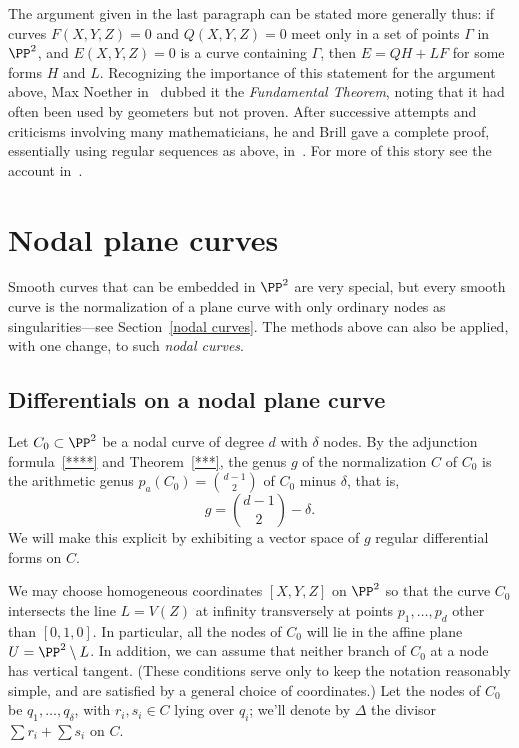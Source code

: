 The argument given in the last paragraph can be stated more generally thus:  if curves $F(X,Y,Z)=0$ and $Q(X,Y,Z)=0$ 
meet only in a set of  points $\Gamma$ in $\PP^{2}$, and $E(X,Y,Z) = 0$ is a curve containing
$\Gamma$, then $E = QH +LF$ for some forms $H$ and $L$. Recognizing the importance of this
statement for the argument above, Max Noether in~\cite{} dubbed it the \emph{Fundamental Theorem}, 
noting that it had often been used by geometers but not proven. After successive attempts and 
criticisms involving many mathematicians, he and Brill gave a complete proof, essentially using
regular sequences as above, in~\cite{}. For more of this story see the account in~\cite{Eisenbud-Gray}.

\section{Nodal plane curves}


Smooth curves that can be embedded in $\PP^{2}$ are very special, but every smooth curve 
is the normalization of a plane curve with only ordinary nodes as singularities---see Section~\ref{nodal curves}.  The methods above can also be applied, with one change, to such \emph{nodal curves}.

\subsection{Differentials on a nodal plane curve}\label{canonical series on nodal plane curves}

Let $C_{0} \subset \PP^2$  be a nodal curve of degree $d$ with $\delta$ nodes. By the adjunction
formula~\ref{****} and Theorem~\ref{***}, the genus $g$ of the normalization $C$ of $C_{0}$ is
the arithmetic genus $p_{a}(C_{0}) = \binom{d-1}{2}$ of $C_{0}$ minus $\delta$, that is,
$$
g = \binom{d-1}{2} -\delta.
$$
We will make this explicit by exhibiting a vector space of $g$ regular differential forms on $C$.

We may choose homogeneous coordinates  $[X,Y,Z]$ on $\PP^2$ so that the curve $C_0$ intersects the line $L = V(Z)$ at infinity transversely at points $p_1,\dots,p_d$ other than $[0,1,0]$. In particular,  all the nodes of $C_0$ will lie in the affine plane $U = \PP^2 \setminus L$.
In addition, we can assume that  neither branch of $C_0$ at a node has vertical tangent. (These conditions serve only to keep the notation reasonably simple, and are satisfied by a general choice of coordinates.) Let the nodes of $C_0$ be $q_1,\dots,q_\delta$, with $r_i, s_i \in C$ lying over $q_i$; we'll denote by $\Delta$ the divisor $\sum r_i + \sum s_i$ on $C$.

